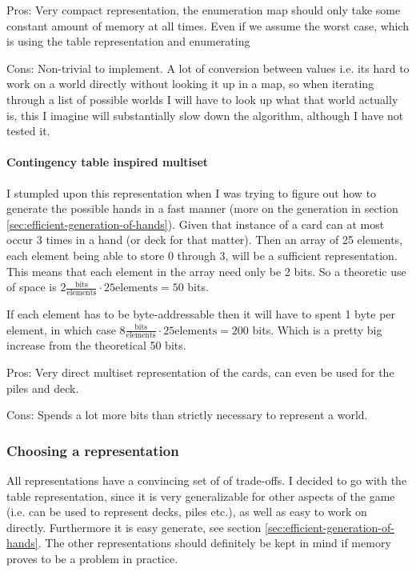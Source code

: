 Pros: Very compact representation, the enumeration map should only take some constant amount of memory at all times.
Even if we assume the worst case, which is using the table representation and enumerating

Cons: Non-trivial to implement.
A lot of conversion between values i.e. its hard to work on a world directly without looking it up in a map, so when iterating through a list of possible worlds I will have to look up what that world actually is, this I imagine will substantially slow down the algorithm, although I have not tested it.

\paragraph{Contingency table inspired multiset}
I stumpled upon this representation when I was trying to figure out how to generate the possible hands in a fast manner (more on the generation in section \ref{sec:efficient-generation-of-hands}).
Given that instance of a card can at most occur 3 times in a hand (or deck for that matter).
Then an array of 25 elements, each element being able to store 0 through 3, will be a sufficient representation.
This means that each element in the array need only be 2 bits.
So a theoretic use of space is $2 \frac{\text{bits}}{\text{elements}} \cdot 25\text{elements} = 50$ bits. 

If each element has to be byte-addressable then it will have to spent 1 byte per element, in which case $8 \frac{\text{bits}}{\text{elements}} \cdot 25\text{elements} = 200$ bits.
Which is a pretty big increase from the theoretical 50 bits.  

Pros: Very direct multiset representation of the cards, can even be used for the piles and deck. 

Cons: Spends a lot more bits than strictly necessary to represent a world.


\subsubsection{Choosing a representation}
All representations have a convincing set of of trade-offs.
I decided to go with the table representation, since it is very generalizable for other aspects of the game (i.e. can be used to represent decks, piles etc.), as well as easy to work on directly.
Furthermore it is easy generate, see section \ref{sec:efficient-generation-of-hands}.
The other representations should definitely be kept in mind if memory proves to be a problem in practice.


